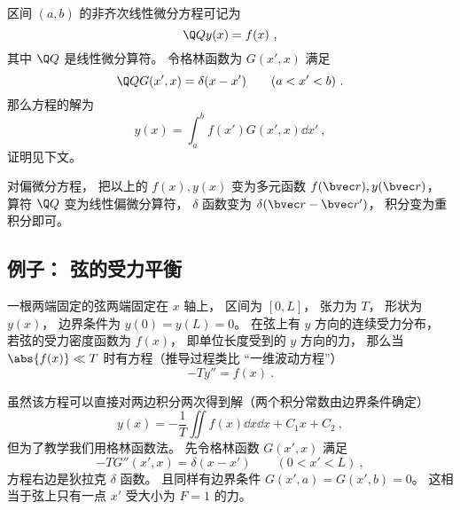 

区间 $(a,b)$ 的非齐次线性微分方程可记为
\begin{equation}\label{eq_GreenF_5}
\Q Q y(x) = f(x)~,
\end{equation}
其中 $\Q Q$ 是线性微分算符。 令格林函数为 $G(x', x)$ 满足
\begin{equation}\label{eq_GreenF_7}
\Q Q G(x', x) = \delta(x - x') \qquad (a < x' < b)~.
\end{equation}
那么方程的解为
\begin{equation}\label{eq_GreenF_4}
y(x) = \int_a^b f(x') G(x', x) \dd{x'}~,
\end{equation}
证明见下文。

对偏微分方程， 把以上的 $f(x), y(x)$ 变为多元函数 $f(\bvec r), y(\bvec r)$， 算符 $\Q Q$ 变为线性偏微分算符， $\delta$ 函数变为 $\delta(\bvec r - \bvec r')$， 积分变为重积分即可。

\subsection{例子： 弦的受力平衡}

一根两端固定的弦两端固定在 $x$ 轴上， 区间为 $[0, L]$， 张力为 $T$， 形状为 $y(x)$， 边界条件为 $y(0) = y(L) = 0$。 在弦上有 $y$ 方向的连续受力分布， 若弦的受力密度函数为 $f(x)$， 即单位长度受到的 $y$ 方向的力， 那么当 $\abs{f(x)} \ll T$ 时有方程（推导过程类比 “一维波动方程”）
\begin{equation}\label{eq_GreenF_1}
-T y'' = f(x)~.
\end{equation}

虽然该方程可以直接对两边积分两次得到解（两个积分常数由边界条件确定）
\begin{equation}\label{eq_GreenF_14}
y(x) = -\frac{1}{T}\iint f(x) \dd{x}\dd{x} + C_1 x + C_2~,
\end{equation}
但为了教学我们用格林函数法。 先令格林函数 $G(x', x)$ 满足
\begin{equation}\label{eq_GreenF_2}
-T G''(x', x) = \delta(x - x') \qquad (0 < x' < L)~,
\end{equation}
方程右边是狄拉克 $\delta$ 函数。 且同样有边界条件 $G(x', a) = G(x', b) = 0$。 这相当于弦上只有一点 $x'$ 受大小为 $F = 1$ 的力。

